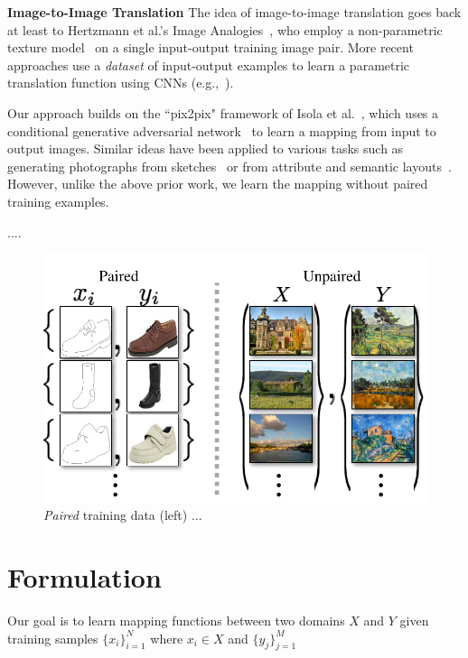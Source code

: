 \documentclass[10pt,twocolumn,letterpaper]{article}
\begin{document}
 

{\bf Image-to-Image Translation}
The idea of image-to-image translation goes back at least to Hertzmann et al.'s Image Analogies~\cite{hertzmann2001image}, who employ a non-parametric texture model~\cite{efros1999texture} on a single input-output training image pair.
More recent approaches use a \emph{dataset} of input-output examples to learn a parametric translation function using CNNs (e.g.,~\cite{long2015fully}). 

Our approach builds on the ``pix2pix" framework of Isola et al.~\cite{isola2016image}, which uses a conditional generative adversarial network~\cite{goodfellow2014generative} to learn a mapping from input to output images. Similar ideas have been applied to various tasks such as generating photographs from sketches~\cite{sangkloy2016scribbler} or from attribute and semantic layouts~\cite{karacan2016learning}. However, unlike the above prior work, we learn the mapping without paired training examples. 

....


\begin{figure}
 \centering
 \includegraphics[width=1.0\hsize]{paired_unpaired2.pdf}
 \vspace{-0.3in}
  \caption{\emph{Paired} training data (left)  ...}
 \vspace{-0.2in}
\end{figure}

\section{Formulation}
 


Our goal is to learn mapping functions between two domains $X$ and $Y$ given training samples $\{x_i\}_{i=1}^N$ where $x_i \in X$ and $\{y_j\}_{j=1}^M$  
\end{document}
